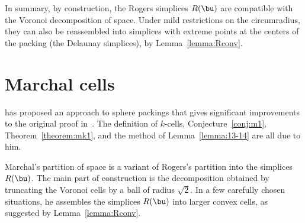 In summary,
by construction, the Rogers simplices $R(\bu)$  are
compatible with the Voronoi decomposition of space.  Under mild
restrictions on the circumradius, they can also be reassembled into
simplices with extreme points at the centers of the packing (the Delaunay
simplices), by Lemma~\ref{lemma:Rconv}.
%
%




\section{Marchal cells}

\cite{marchal:2008} has proposed an approach to sphere packings
 that gives significant improvements to the original proof
in~\cite{Hales:2006:DCG}.  The definition of $k$-cells,
Conjecture~\ref{conj:m1}, Theorem~\ref{theorem:mk1}, and the method of
Lemma~\ref{lemma:13-14} are all due to him.  
%


Marchal's partition of space is a variant of Rogers's partition into
the simplices $R(\bu)$.  The main part of construction is the
decomposition obtained by truncating the Voronoi cells by a ball of
radius $\sqrt2$.  In a few carefully chosen situations, he assembles
the simplices $R(\bu)$ into larger convex cells, as suggested by
Lemma~\ref{lemma:Rconv}.




